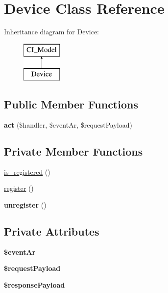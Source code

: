 \hypertarget{class_device}{\section{Device Class Reference}
\label{class_device}
}
Inheritance diagram for Device\-:\begin{figure}[H]
\begin{center}
\leavevmode
\includegraphics[height=2.000000cm]{class_device}
\end{center}
\end{figure}
\subsection*{Public Member Functions}
\begin{DoxyCompactItemize}
\item 
\hypertarget{class_device_a872d998d504d0e4ddc66c46460ae6bbc}{{\bfseries act} (\$handler, \$event\-Ar, \$request\-Payload)}\label{class_device_a872d998d504d0e4ddc66c46460ae6bbc}

\end{DoxyCompactItemize}
\subsection*{Private Member Functions}
\begin{DoxyCompactItemize}
\item 
\hyperlink{class_device_a8d6fe901dd1f888876a2b159d04bb924}{is\-\_\-registered} ()
\item 
\hyperlink{class_device_a5f4a27220ff8628c8061006b091b5130}{register} ()
\item 
\hypertarget{class_device_a247b08114d99e3621de8447ecdcbba0c}{{\bfseries unregister} ()}\label{class_device_a247b08114d99e3621de8447ecdcbba0c}

\end{DoxyCompactItemize}
\subsection*{Private Attributes}
\begin{DoxyCompactItemize}
\item 
\hypertarget{class_device_aafd9f7f45285f1b3068131cc13203611}{{\bfseries \$event\-Ar}}\label{class_device_aafd9f7f45285f1b3068131cc13203611}

\item 
\hypertarget{class_device_a267de20ffabb63056fa815d274b81353}{{\bfseries \$request\-Payload}}\label{class_device_a267de20ffabb63056fa815d274b81353}

\item 
\hypertarget{class_device_a4905a2e544394db16a684f8a53e43342}{{\bfseries \$response\-Payload}}\label{class_device_a4905a2e544394db16a684f8a53e43342}

\end{DoxyCompactItemize}


